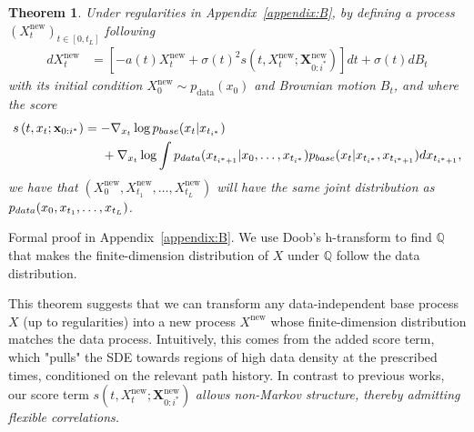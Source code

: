 \documentclass{article}
\newcommand{\pdata}{p_{\normalfont{data}}}
\newcommand{\pbase}{p_{\normalfont{base}}}
\newtheorem{theorem}{Theorem}
\begin{document}
\begin{theorem}
    \label{thm:new_sde}
    Under regularities in Appendix~\ref{appendix:B}, by defining a process $(X^{\text{new}}_t)_{t \in [0, t_L]}$ following
    \allowdisplaybreaks
    \begin{align}
        dX^{\text{new}}_t &= \left[-a(t)X^{\text{new}}_t + \sigma(t)^2 s\left(t,X^{\text{new}}_t; \mathbf{X}^{\text{new}}_{0:i^*}\right)\right]dt + \sigma(t)dB_t \label{eqn:new_sde}
    \end{align}
    with its initial condition $X^{\text{new}}_0 \sim p_{\text{data}}(x_0)$ and Brownian motion $B_t$, and
    where the score
    \begin{align}
        s\left(t,x_t; \mathbf{x}_{0:i^*}\right) &= -\nabla_{x_t}\log \pbase (x_t | x_{t_{i^*}})\notag\\&\hspace{14pt}
        + \nabla_{x_t}\log \int \pdata (x_{t_{i^* + 1}} | x_0, \ldots, x_{t_{i^*}}) \pbase (x_t | x_{t_{i^*}}, x_{t_{i^*+1}}) dx_{t_{i^*+1}}\label{eqn:expanded_score_main},
    \end{align}
    we have that $\left(X_0^{\text{new}}, X_{t_1}^{\text{new}}, \dots, X_{t_L}^{\text{new}}\right)$ will have the same joint distribution as $\pdata(x_0, x_{t_1}, \ldots, x_{t_L})$.
\end{theorem}
Formal proof in Appendix~\ref{appendix:B}. We use Doob's h-transform \cite{doob1984classical, girsanov1960transforming} to find $\mathbb{Q}$ that makes the finite-dimension distribution of $X$ under $\mathbb{Q}$ follow the data distribution.%

This theorem suggests that we can transform any data-independent base process $X$ (up to regularities) into a new process $X^{\text{new}}$ whose finite-dimension distribution matches the data process. Intuitively, this comes from the added score term, which "pulls" the SDE towards regions of high data density at the prescribed times, conditioned on the relevant path history.
In contrast to previous works, our score term $s\left(t,X^{\text{new}}_t; \mathbf{X}^{\text{new}}_{0:i^*}\right)$ \textit{allows non-Markov structure, thereby admitting flexible correlations.}
\end{document}
